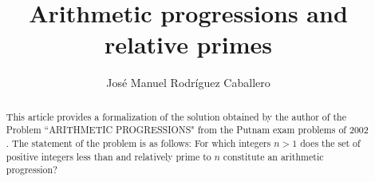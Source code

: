 \documentclass[11pt,a4paper]{article}
\begin{document}
\title{Arithmetic progressions and relative primes}
\author{Jos\'e Manuel Rodr\'iguez Caballero}
\maketitle

\begin{abstract}
This article provides a formalization of the solution obtained by the author of the Problem ``ARITHMETIC PROGRESSIONS" from the 
Putnam exam problems \cite{putnam} of $2002$. The statement of the problem is as follows: For which integers $n>1$ does the set of positive integers less than and relatively prime to $n$ constitute an arithmetic progression?
\end{abstract}

\tableofcontents






\end{document}
